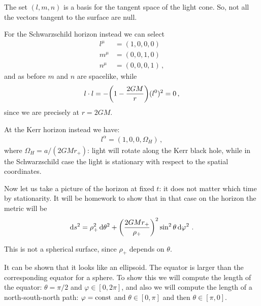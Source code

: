 \documentclass[main.tex]{subfiles}
\begin{document}
The set \((l, m, n)\) is  a basis for the tangent space of the light cone. 
So, not all the vectors tangent to the surface are null. 

For the Schwarzschild horizon instead we can select 
%
\begin{subequations}
\begin{align}
  l^{\mu } &= (1, 0, 0, 0)  \\
  m^{\mu } &= (0,0,1, 0)  \\
  n^{\mu } &= (0,0,0, 1)
\,,
\end{align}
\end{subequations}
%
and as before \(m\) and \(n\) are spacelike, while 
%
\begin{align}
  l \cdot l = - \qty(1 - \frac{2GM}{r}) (l^{0})^2 = 0 
\,,
\end{align}
%
since we are precisely at \(r = 2GM\). 

At the Kerr horizon instead we have: 
%
\begin{align}
  l^{\alpha } = (1, 0, 0, \Omega_{H})
\,,
\end{align}
%
where  \(\Omega_{H}= a / (2GMr_+)\): light will rotate along the Kerr black hole, while in the Schwarzschild case the light is stationary with respect to the spatial coordinates. 

Now let us take a picture of the horizon at fixed \(t\): 
it does not matter which time by stationarity. It will be homework to show that in that case on the horizon the metric will be 
%
\begin{align}
\dd{s^2} = \rho_{+}^2 \dd{\theta^2} + \qty(\frac{2GMr_+}{\rho_{+}})^2 \sin^2 \theta \dd{\varphi^2}
\,.
\end{align}

This is not a spherical surface, since \(\rho_{+}\) depends on \(\theta \). 

It can be shown that it looks like an ellipsoid. The equator is larger than the corresponding equator for a sphere. To show this we will compute the length of the equator: \(\theta = \pi /2\) and \(\varphi \in [0, 2 \pi ]\), and also we will compute the length of a north-south-north path: \(\varphi = \text{const}\) and \(\theta \in [0, \pi ]\) and then \(\theta \in [\pi , 0]\).
\end{document}

